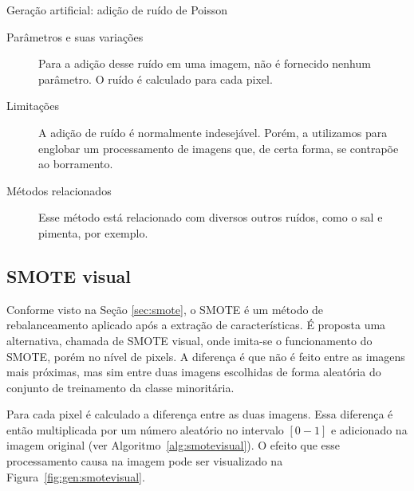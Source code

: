 \begin{algorithm}[!htbp]
  \caption{Geração artificial: adição de ruído de Poisson}
  \label{alg:noise}
  \SetAlgoLined

\end{algorithm}

\begin{description}
  \item[Parâmetros e suas variações] Para a adição desse ruído em uma imagem, não é fornecido nenhum parâmetro. O ruído é calculado para cada pixel.
  \item[Limitações] A adição de ruído é normalmente indesejável. Porém, a utilizamos para englobar um processamento de imagens que, de certa forma, se contrapõe ao borramento.
  \item[Métodos relacionados] Esse método está relacionado com diversos outros ruídos, como o sal e pimenta, por exemplo.
\end{description}
\FloatBarrier
\subsection{SMOTE visual}

Conforme visto na Seção \ref{sec:smote}, o SMOTE é um método de rebalanceamento aplicado após a extração de características. É proposta uma alternativa, chamada de SMOTE visual, onde imita-se o funcionamento do SMOTE, porém no nível de pixels. A diferença é que não é feito entre as imagens mais próximas, mas sim entre duas imagens escolhidas de forma aleatória do conjunto de treinamento da classe minoritária.

Para cada pixel é calculado a diferença entre as duas imagens. Essa diferença é então multiplicada por um número aleatório no intervalo $[0-1]$ e adicionado
na imagem original (ver Algoritmo~\ref{alg:smotevisual}). O efeito que esse processamento causa na imagem pode ser visualizado na Figura~\ref{fig:gen:smotevisual}.

